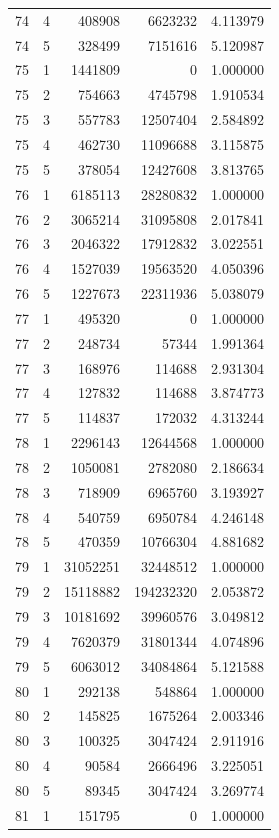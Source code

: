 \begin{longtable}{rrrrr}
74 & 4 & 408908 & 6623232 & 4.113979 \\
74 & 5 & 328499 & 7151616 & 5.120987 \\
75 & 1 & 1441809 & 0 & 1.000000 \\
75 & 2 & 754663 & 4745798 & 1.910534 \\
75 & 3 & 557783 & 12507404 & 2.584892 \\
75 & 4 & 462730 & 11096688 & 3.115875 \\
75 & 5 & 378054 & 12427608 & 3.813765 \\
76 & 1 & 6185113 & 28280832 & 1.000000 \\
76 & 2 & 3065214 & 31095808 & 2.017841 \\
76 & 3 & 2046322 & 17912832 & 3.022551 \\
76 & 4 & 1527039 & 19563520 & 4.050396 \\
76 & 5 & 1227673 & 22311936 & 5.038079 \\
77 & 1 & 495320 & 0 & 1.000000 \\
77 & 2 & 248734 & 57344 & 1.991364 \\
77 & 3 & 168976 & 114688 & 2.931304 \\
77 & 4 & 127832 & 114688 & 3.874773 \\
77 & 5 & 114837 & 172032 & 4.313244 \\
78 & 1 & 2296143 & 12644568 & 1.000000 \\
78 & 2 & 1050081 & 2782080 & 2.186634 \\
78 & 3 & 718909 & 6965760 & 3.193927 \\
78 & 4 & 540759 & 6950784 & 4.246148 \\
78 & 5 & 470359 & 10766304 & 4.881682 \\
79 & 1 & 31052251 & 32448512 & 1.000000 \\
79 & 2 & 15118882 & 194232320 & 2.053872 \\
79 & 3 & 10181692 & 39960576 & 3.049812 \\
79 & 4 & 7620379 & 31801344 & 4.074896 \\
79 & 5 & 6063012 & 34084864 & 5.121588 \\
80 & 1 & 292138 & 548864 & 1.000000 \\
80 & 2 & 145825 & 1675264 & 2.003346 \\
80 & 3 & 100325 & 3047424 & 2.911916 \\
80 & 4 & 90584 & 2666496 & 3.225051 \\
80 & 5 & 89345 & 3047424 & 3.269774 \\
81 & 1 & 151795 & 0 & 1.000000 \\

\end{longtable}
